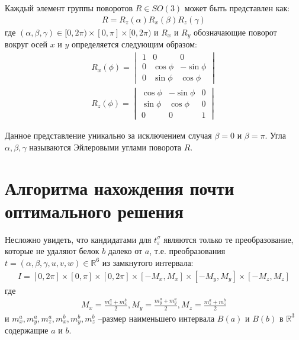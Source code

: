 \documentclass[a4paper]{extreport}
\newcommand{\eps}{\varepsilon}
\begin{document}
Каждый элемент группы поворотов $R \in SO(3)$ может быть представлен как:
\begin{gather*}
R = R_z ( \alpha) R_x(\beta) R_z (\gamma)
\end{gather*} 
где $(\alpha, \beta, \gamma) \in [0, 2\pi) \times [0, \pi] \times [0, 2\pi)$ и $R_x$ и $R_y$ обозначающие поворот вокруг осей $x$ и $y$ определяется следующим образом:
\begin{gather*}
R_x(\phi) = \begin{vmatrix}
1 & 0 & 0\\
0 & \cos \phi & - \sin \phi\\
0 & \sin \phi & \cos \phi 
\end{vmatrix}\\
R_z(\phi) = \begin{vmatrix}
\cos\phi & -\sin\phi & 0\\
\sin\phi & \cos\phi & 0\\
0 & 0 & 1
\end{vmatrix}
\end{gather*}

Данное представление уникально за исключением случая $\beta = 0$ и $\beta = \pi$. Угла $\alpha, \beta, \gamma$ называются Эйлеровыми углами поворота $R$.

\section{ Алгоритма нахождения почти оптимального решения}

Несложно увидеть, что кандидатами для $t_\eps^\sigma$ являются только те преобразование, которые не удаляют белок $b$ далеко от $a$, т.е. преобразования $t=(\alpha, \beta, \gamma, u, v, w) \in \mathbb{R}^6$ из замкнутого интервала:
\begin{gather*}
I = [0, 2\pi] \times [0, \pi] \times [0, 2\pi] \times [-M_x, M_x] \times [-M_y, M_y] \times [-M_z, M_z]
\end{gather*}
где
\begin{gather*}
M_x = \frac{m_x^a + m_x^b}{2}, M_y = \frac{m_y^a + m_y^a}{2}, M_z = \frac{m_z^a + m_z^b}{2}
\end{gather*}
и $m_x^a, m_y^a, m_z^a, m_x^b, m_y^b, m_z^b$ --размер наименьшего интервала $B(a)$ и $B(b)$ в $\mathbb{R}^3$ содержащие $a$ и $b$.
\end{document}
